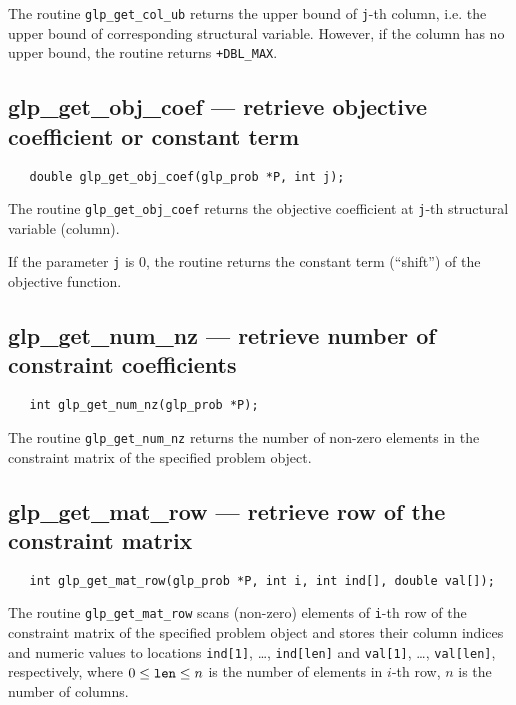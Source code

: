 \returns

The routine \verb|glp_get_col_ub| returns the upper bound of
\verb|j|-th column, i.e. the upper bound of corresponding structural
variable. However, if the column has no upper bound, the routine
returns \verb|+DBL_MAX|.

\subsection{glp\_get\_obj\_coef --- retrieve objective coefficient or
constant term}

\synopsis

\begin{verbatim}
   double glp_get_obj_coef(glp_prob *P, int j);
\end{verbatim}

\returns

The routine \verb|glp_get_obj_coef| returns the objective coefficient
at \verb|j|-th structural variable (column).

If the parameter \verb|j| is 0, the routine returns the constant term
(``shift'') of the objective function.

\subsection{glp\_get\_num\_nz --- retrieve number of constraint
coefficients}

\synopsis

\begin{verbatim}
   int glp_get_num_nz(glp_prob *P);
\end{verbatim}

\returns

The routine \verb|glp_get_num_nz| returns the number of non-zero
elements in the constraint matrix of the specified problem object.

\subsection{glp\_get\_mat\_row --- retrieve row of the constraint
matrix}

\synopsis

\begin{verbatim}
   int glp_get_mat_row(glp_prob *P, int i, int ind[], double val[]);
\end{verbatim}

\description

The routine \verb|glp_get_mat_row| scans (non-zero) elements of
\verb|i|-th row of the constraint matrix of the specified problem
object and stores their column indices and numeric values to locations
\verb|ind[1]|, \dots, \verb|ind[len]| and \verb|val[1]|, \dots,
\verb|val[len]|, respectively, where $0\leq{\tt len}\leq n$ is the
number of elements in $i$-th row, $n$ is the number of columns.

